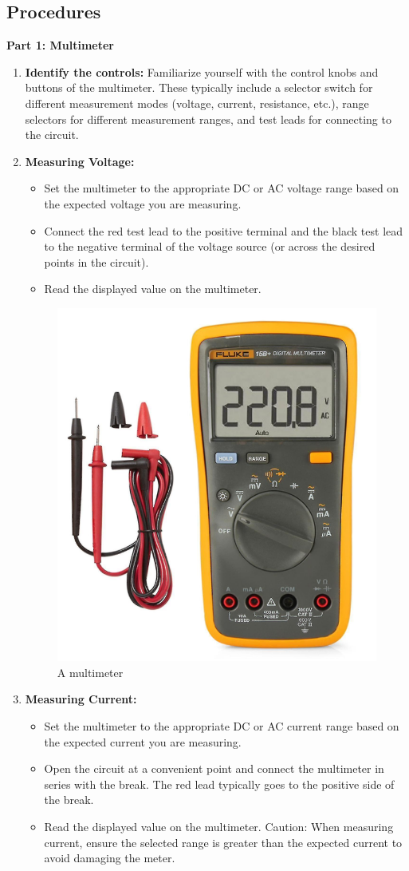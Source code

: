 \subsection*{Procedures}
\nonindent \textbf{Part 1: Multimeter}
\begin{enumerate}
    \item \textbf{Identify the controls:} Familiarize yourself with the control knobs and buttons of the multimeter. These typically include a selector switch for different measurement modes (voltage, current, resistance, etc.), range selectors for different measurement ranges, and test leads for connecting to the circuit.
    \item \textbf{Measuring Voltage:} 
    \begin{itemize}
        \item Set the multimeter to the appropriate DC or AC voltage range based on the expected voltage you are measuring.
        \item Connect the red test lead to the positive terminal and the black test lead to the negative terminal of the voltage source (or across the desired points in the circuit).
        \item Read the displayed value on the multimeter.
    \end{itemize}

    \begin{figure}[H]
        \centering
        \includegraphics[width=0.6\linewidth]{img/multimeter.png}
        \caption{A multimeter}
        \label{fig:multimeter}
    \end{figure}

    \item \textbf{Measuring Current:}
    \begin{itemize}
        \item  Set the multimeter to the appropriate DC or AC current range based on the expected current you are measuring.
        \item Open the circuit at a convenient point and connect the multimeter in series with the break. The red lead typically goes to the positive side of the break.
        \item Read the displayed value on the multimeter. Caution: When measuring current, ensure the selected range is greater than the expected current to avoid damaging the meter.
    \end{itemize}


\end{enumerate}
